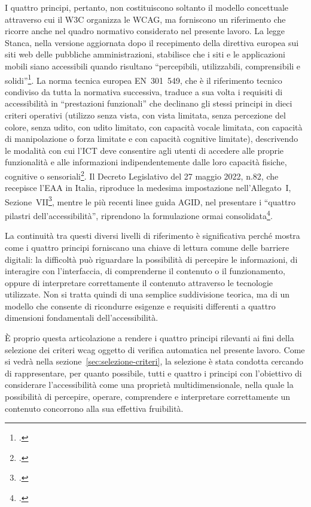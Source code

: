 I quattro principi, pertanto, non costituiscono soltanto il modello concettuale attraverso cui il W3C organizza le WCAG, ma forniscono un riferimento che ricorre anche nel quadro normativo considerato nel presente lavoro. La legge Stanca, nella versione aggiornata dopo il recepimento della direttiva europea sui siti web delle pubbliche amministrazioni, stabilisce che i siti e le applicazioni mobili siano accessibili quando risultano \enquote{percepibili, utilizzabili, comprensibili e solidi}\footcite[art.~3-bis, comma~1]{legge:stanca}. La norma tecnica europea EN~301~549, che è il riferimento tecnico condiviso da tutta la normativa successiva, traduce a sua volta i requisiti di accessibilità in \enquote{prestazioni funzionali} che declinano gli stessi principi in dieci criteri operativi (utilizzo senza vista, con vista limitata, senza percezione del colore, senza udito, con udito limitato, con capacità vocale limitata, con capacità di manipolazione o forza limitate e con capacità cognitive limitate), descrivendo le modalità con cui l'ICT deve consentire agli utenti di accedere alle proprie funzionalità e alle informazioni indipendentemente dalle loro capacità fisiche, cognitive o sensoriali\footcite[cap.4 \enquote{Prestazioni funzionali}]{norma:en301549}. Il Decreto Legislativo del 27 maggio 2022, n.82, che recepisce l'EAA in Italia, riproduce la medesima impostazione nell'Allegato~I, Sezione~VII\footcite[Allegato~I, Sezione~VII]{dlgs:82-2022}, mentre le più recenti linee guida AGID, nel presentare i \enquote{quattro pilastri dell'accessibilità}, riprendono la formulazione ormai consolidata\footcite[§~6.1]{agid:lg-82-2022}.

La continuità tra questi diversi livelli di riferimento è significativa perché mostra come i quattro principi forniscano una chiave di lettura comune delle barriere digitali: la difficoltà può riguardare la possibilità di percepire le informazioni, di interagire con l'interfaccia, di comprenderne il contenuto o il funzionamento, oppure di interpretare correttamente il contenuto attraverso le tecnologie utilizzate. Non si tratta quindi di una semplice suddivisione teorica, ma di un modello che consente di ricondurre esigenze e requisiti differenti a quattro dimensioni fondamentali dell'accessibilità.

È proprio questa articolazione a rendere i quattro principi rilevanti ai fini della selezione dei criteri \gls{wcag} oggetto di verifica automatica nel presente lavoro. Come si vedrà nella sezione~\ref{sec:selezione-criteri}, la selezione è stata condotta cercando di rappresentare, per quanto possibile, tutti e quattro i principi con l'obiettivo di considerare l'accessibilità come una proprietà multidimensionale, nella quale la possibilità di percepire, operare, comprendere e interpretare correttamente un contenuto concorrono alla sua effettiva fruibilità.


